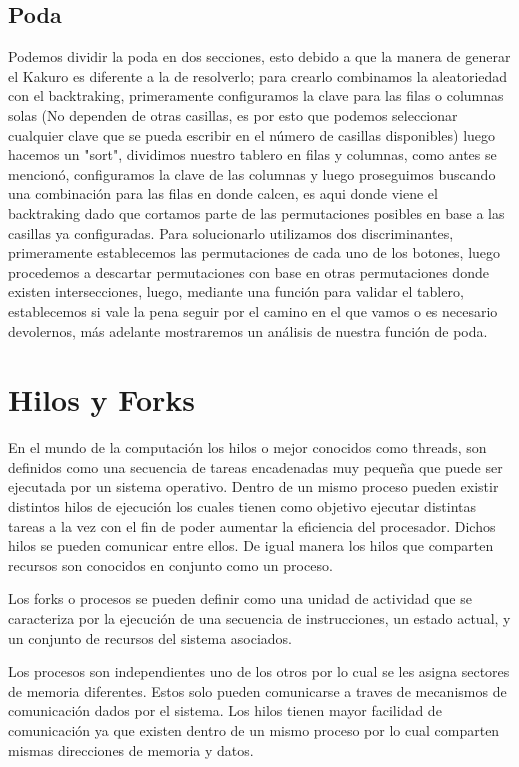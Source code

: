 \documentclass[conference]{IEEEtran}
\begin{document}
\subsection{Poda}
Podemos dividir la poda en dos secciones, esto debido a que la manera de generar el Kakuro es diferente a la de resolverlo; para crearlo combinamos la aleatoriedad con el backtraking, primeramente configuramos la clave para las filas o columnas solas (No dependen de otras casillas, es por esto que podemos seleccionar cualquier clave que se pueda escribir en el número de casillas disponibles) luego hacemos un "sort", dividimos nuestro tablero en filas y columnas, como antes se mencionó, configuramos la clave de las columnas y luego proseguimos buscando una combinación para las filas en donde calcen, es aqui donde viene el backtraking dado que cortamos parte de las permutaciones posibles en base a las casillas ya configuradas. Para solucionarlo utilizamos dos discriminantes, primeramente establecemos las permutaciones de cada uno de los botones, luego procedemos a descartar permutaciones con base en otras permutaciones donde existen intersecciones, luego, mediante una función para validar el tablero, establecemos si vale la pena seguir por el camino en el que vamos o es necesario devolernos, más adelante mostraremos un análisis de nuestra función de poda.



\section{Hilos y Forks}

En el mundo de la computación los hilos o mejor conocidos como threads, son definidos como una secuencia de  tareas encadenadas muy pequeña que puede ser ejecutada por un sistema operativo. Dentro de un mismo proceso pueden existir distintos hilos de ejecución los cuales tienen como objetivo ejecutar distintas tareas a la vez con el fin de poder aumentar la eficiencia del procesador. Dichos hilos se pueden comunicar entre ellos. De igual manera los hilos que comparten recursos son conocidos en conjunto como un proceso.

\par 
Los forks o procesos se pueden definir como una unidad de actividad que se caracteriza por la ejecución de una secuencia de instrucciones, un estado actual, y un conjunto de recursos del sistema asociados.

\par 
Los procesos son independientes uno de los otros por lo cual se les asigna sectores de memoria diferentes. Estos solo pueden comunicarse a traves de mecanismos de comunicación dados por el sistema. Los hilos tienen mayor facilidad de comunicación ya que existen dentro de un mismo proceso por lo cual comparten mismas direcciones de memoria y datos.
\end{document}
